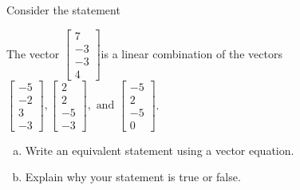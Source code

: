 
\begin{exerciseStatement}


Consider the statement 
\begin{center}\begin{minipage}{0.8\textwidth}
 The vector \( \left[\begin{array}{c}
7 \\
-3 \\
-3 \\
4
\end{array}\right] \)is a linear combination of the vectors \( \left[\begin{array}{c}
-5 \\
-2 \\
3 \\
-3
\end{array}\right] , \left[\begin{array}{c}
2 \\
2 \\
-5 \\
-3
\end{array}\right] , \text{ and } \left[\begin{array}{c}
-5 \\
2 \\
-5 \\
0
\end{array}\right] \). 
\end{minipage}\end{center}
    


\begin{enumerate}[(a)]
\item  Write an equivalent statement using a vector equation.
\item  Explain why your statement is true or false.
\end{enumerate}
    
\end{exerciseStatement}
    
